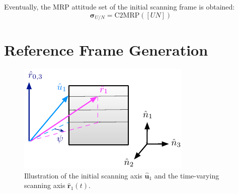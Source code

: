 \documentclass[]{AVSSimReportMemo}
\begin{document}
Eventually, the MRP attitude set of the initial scanning frame is obtained:
\begin{equation}
	\bm{\sigma}_{U/N} =  \textrm{C2MRP}([UN])
\end{equation}


\section{Reference Frame Generation}
\begin{figure}[htb]
	\centerline{
	\includegraphics{Figures/fig2}
	}
	\caption{Illustration of the initial scanning axis $\hat {\bm u}_1$
	 and the time-varying scanning axis $\hat{\bm r}_1(t)$.}
	\label{fig:fig2}
\end{figure}
\end{document}
